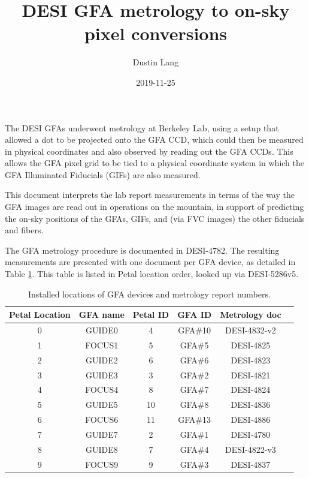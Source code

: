 \documentclass[10pt]{article}
\title{DESI GFA metrology to on-sky pixel conversions}
\author{Dustin Lang}
\date{2019-11-25}
\begin{document}
\maketitle

The DESI GFAs underwent metrology at Berkeley Lab, using a setup that
allowed a dot to be projected onto the GFA CCD, which could then be
measured in physical coordinates and also observed by reading out the
GFA CCDs.  This allows the GFA pixel grid to be tied to a physical
coordinate system in which the GFA Illuminated Fiducials (GIFs) are
also measured.

This document interprets the lab report measurements in terms of the
way the GFA images are read out in operations on the mountain, in
support of predicting the on-sky positions of the GFAs, GIFs, and (via
FVC images) the other fiducials and fibers.

The GFA metrology procedure is documented in DESI-4782.  The resulting
measurements are presented with one document per GFA device, as
detailed in Table \ref{tab:gfareports}.  This table is listed in Petal
location order, looked up via DESI-5286v5.

\begin{table}[h!]
  \begin{center}
    \begin{tabular}{|c|c|c|c|c|c|}
      \hline
      Petal Location & GFA name & Petal ID & GFA ID & Metrology doc \\
      \hline
      0 & GUIDE0 & 4  & GFA\#10 & DESI-4832-v2 \\
      1 & FOCUS1 & 5  & GFA\#5 & DESI-4825 \\
      2 & GUIDE2 & 6  & GFA\#6 & DESI-4823 \\
      3 & GUIDE3 & 3  & GFA\#2 & DESI-4821 \\
      4 & FOCUS4 & 8  & GFA\#7 & DESI-4824 \\
      5 & GUIDE5 & 10 & GFA\#8 & DESI-4836 \\
      6 & FOCUS6 & 11 & GFA\#13 & DESI-4886 \\
      7 & GUIDE7 & 2  & GFA\#1 & DESI-4780 \\
      8 & GUIDE8 & 7  & GFA\#4 & DESI-4822-v3 \\
      9 & FOCUS9 & 9  & GFA\#3 & DESI-4837 \\
      \hline
    \end{tabular}
    \caption{\label{tab:gfareports}Installed locations of GFA devices and
      metrology report numbers.}
  \end{center}
\end{table}
\end{document}
